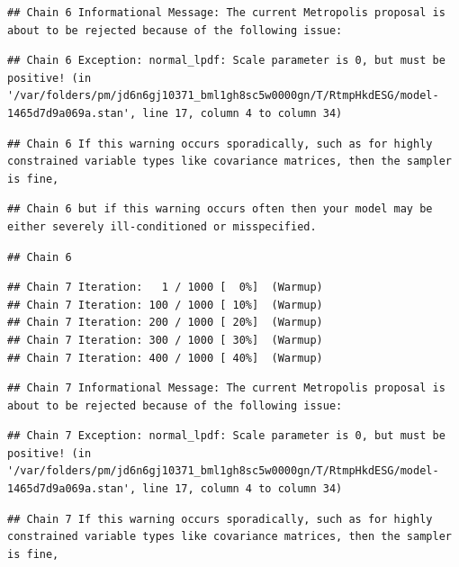 \documentclass[
]{article}
\begin{document}
\begin{verbatim}
## Chain 6 Informational Message: The current Metropolis proposal is about to be rejected because of the following issue:
\end{verbatim}

\begin{verbatim}
## Chain 6 Exception: normal_lpdf: Scale parameter is 0, but must be positive! (in '/var/folders/pm/jd6n6gj10371_bml1gh8sc5w0000gn/T/RtmpHkdESG/model-1465d7d9a069a.stan', line 17, column 4 to column 34)
\end{verbatim}

\begin{verbatim}
## Chain 6 If this warning occurs sporadically, such as for highly constrained variable types like covariance matrices, then the sampler is fine,
\end{verbatim}

\begin{verbatim}
## Chain 6 but if this warning occurs often then your model may be either severely ill-conditioned or misspecified.
\end{verbatim}

\begin{verbatim}
## Chain 6
\end{verbatim}

\begin{verbatim}
## Chain 7 Iteration:   1 / 1000 [  0%]  (Warmup) 
## Chain 7 Iteration: 100 / 1000 [ 10%]  (Warmup) 
## Chain 7 Iteration: 200 / 1000 [ 20%]  (Warmup) 
## Chain 7 Iteration: 300 / 1000 [ 30%]  (Warmup) 
## Chain 7 Iteration: 400 / 1000 [ 40%]  (Warmup)
\end{verbatim}

\begin{verbatim}
## Chain 7 Informational Message: The current Metropolis proposal is about to be rejected because of the following issue:
\end{verbatim}

\begin{verbatim}
## Chain 7 Exception: normal_lpdf: Scale parameter is 0, but must be positive! (in '/var/folders/pm/jd6n6gj10371_bml1gh8sc5w0000gn/T/RtmpHkdESG/model-1465d7d9a069a.stan', line 17, column 4 to column 34)
\end{verbatim}

\begin{verbatim}
## Chain 7 If this warning occurs sporadically, such as for highly constrained variable types like covariance matrices, then the sampler is fine,
\end{verbatim}
\end{document}
